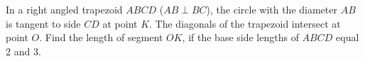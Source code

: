 \problem
In a right angled trapezoid $ABCD$ ($AB \perp BC$), the circle with the
diameter $AB$ is tangent to side $CD$ at point $K$.
The diagonals of the trapezoid intersect at point $O$.
Find the length of segment $OK$, if the base side lengths of $ABCD$ equal $2$
and $3$.
\solution
\endproblem
